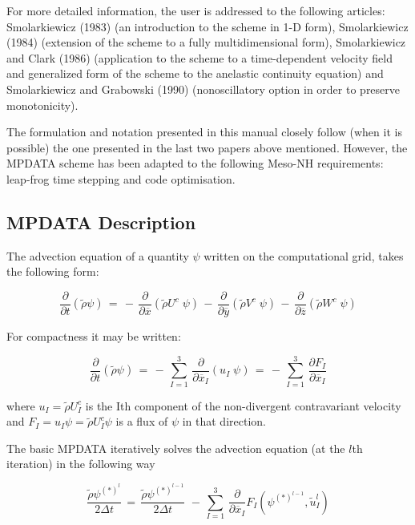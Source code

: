 For more detailed information, the user is addressed to the following articles:
Smolarkiewicz (1983) (an introduction to the scheme in 1-D form), Smolarkiewicz
(1984) (extension of the scheme to a fully multidimensional form), Smolarkiewicz
and Clark (1986) (application to the scheme to a time-dependent velocity field
and generalized form of the scheme
to the anelastic continuity equation) and Smolarkiewicz and
Grabowski (1990) (nonoscillatory option in order to preserve monotonicity).

The formulation and notation presented in this manual closely follow (when
it is possible) the one
presented in the last two papers above mentioned. However, the MPDATA scheme
has been adapted to the following Meso-NH requirements: leap-frog time stepping and
code optimisation.

\subsection{MPDATA Description}

The advection equation of a quantity $\psi$ written on the computational
grid, takes the following form:

\begin{equation}
\dfrac{\partial}{\partial t}(\tilde{\rho}\psi) \, =
 \, - \, \dfrac{\partial }{\partial \overline{x}} (\tilde{\rho} U^{c} \;  \psi)
 \, - \, \dfrac{\partial }{\partial \overline{y}} (\tilde{\rho} V^{c} \;  \psi)
 \, - \, \dfrac{\partial }{\partial \overline{z}} (\tilde{\rho} W^{c} \;  \psi)
\end{equation}

\noindent For compactness it may be written:

\begin{equation}
\dfrac{\partial}{\partial t}(\tilde{\rho}\psi) \, =
 \, - \, \sum_{I=1}^{3} \, \dfrac{\partial }{\partial \overline{x}_I}
 (u_I \; \psi) \, =
 \, - \, \sum_{I=1}^{3} \, \dfrac{\partial F_I }{\partial \overline{x}_I}
\end{equation}

\noindent
 where $u_I = \tilde{\rho} U_{I}^{c}$ is the Ith component of the non-divergent
contravariant velocity and $F_I = u_I \psi = \tilde{\rho} U_{I}^{c} \psi$
is a flux of $\psi$ in that direction.

 The basic MPDATA
iteratively solves the advection equation (at the $l$th iteration) in the
following way

\begin{equation}
\dfrac{\tilde{\rho} \psi^{(*)^{l}}} {2 \Delta t} \, = \,
\dfrac{\tilde{\rho} \psi^{(*)^{l-1}}} {2 \Delta t} \,
 \, - \, \sum_{I=1}^{3} \,  \dfrac{\partial }{\partial \overline{x}_I}
F_I (\psi^{(*)^{l-1}} , \tilde{u}_I^{l} )
\end{equation}

